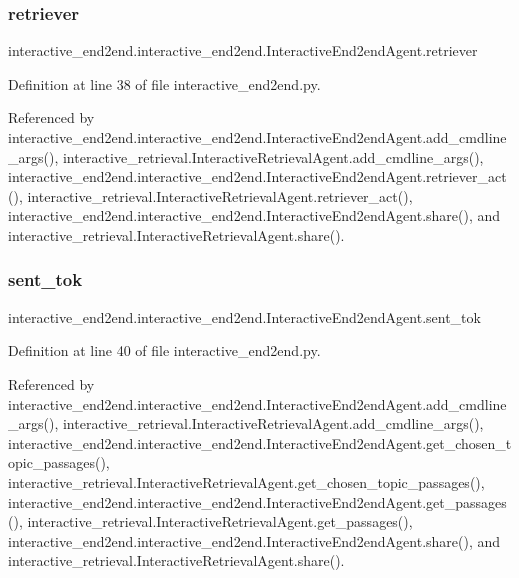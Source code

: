 \subsubsection{\texorpdfstring{retriever}{retriever}}
{\footnotesize\ttfamily interactive\+\_\+end2end.\+interactive\+\_\+end2end.\+Interactive\+End2end\+Agent.\+retriever}



Definition at line 38 of file interactive\+\_\+end2end.\+py.



Referenced by interactive\+\_\+end2end.\+interactive\+\_\+end2end.\+Interactive\+End2end\+Agent.\+add\+\_\+cmdline\+\_\+args(), interactive\+\_\+retrieval.\+Interactive\+Retrieval\+Agent.\+add\+\_\+cmdline\+\_\+args(), interactive\+\_\+end2end.\+interactive\+\_\+end2end.\+Interactive\+End2end\+Agent.\+retriever\+\_\+act(), interactive\+\_\+retrieval.\+Interactive\+Retrieval\+Agent.\+retriever\+\_\+act(), interactive\+\_\+end2end.\+interactive\+\_\+end2end.\+Interactive\+End2end\+Agent.\+share(), and interactive\+\_\+retrieval.\+Interactive\+Retrieval\+Agent.\+share().

\mbox{\label{classinteractive__end2end_1_1interactive__end2end_1_1InteractiveEnd2endAgent_a7ab06ed68f1fcdb8543487f090a1c00c}} 
\subsubsection{\texorpdfstring{sent\+\_\+tok}{sent\_tok}}
{\footnotesize\ttfamily interactive\+\_\+end2end.\+interactive\+\_\+end2end.\+Interactive\+End2end\+Agent.\+sent\+\_\+tok}



Definition at line 40 of file interactive\+\_\+end2end.\+py.



Referenced by interactive\+\_\+end2end.\+interactive\+\_\+end2end.\+Interactive\+End2end\+Agent.\+add\+\_\+cmdline\+\_\+args(), interactive\+\_\+retrieval.\+Interactive\+Retrieval\+Agent.\+add\+\_\+cmdline\+\_\+args(), interactive\+\_\+end2end.\+interactive\+\_\+end2end.\+Interactive\+End2end\+Agent.\+get\+\_\+chosen\+\_\+topic\+\_\+passages(), interactive\+\_\+retrieval.\+Interactive\+Retrieval\+Agent.\+get\+\_\+chosen\+\_\+topic\+\_\+passages(), interactive\+\_\+end2end.\+interactive\+\_\+end2end.\+Interactive\+End2end\+Agent.\+get\+\_\+passages(), interactive\+\_\+retrieval.\+Interactive\+Retrieval\+Agent.\+get\+\_\+passages(), interactive\+\_\+end2end.\+interactive\+\_\+end2end.\+Interactive\+End2end\+Agent.\+share(), and interactive\+\_\+retrieval.\+Interactive\+Retrieval\+Agent.\+share().

